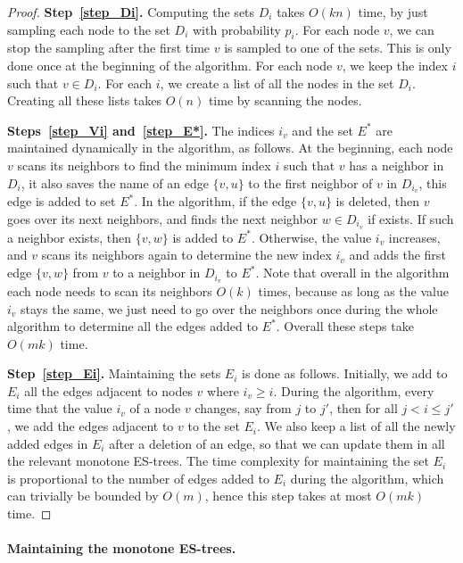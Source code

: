 \begin{proof}
\textbf{Step~\ref{step_Di}.} Computing the sets $D_i$ takes $O(kn)$ time, by just sampling each node to the set $D_i$ with probability $p_i$. For each node $v$, we can stop the sampling after the first time $v$ is sampled to one of the sets. This is only done once at the beginning of the algorithm. For each node $v$, we keep the index $i$ such that $v \in D_i$. For each $i$, we create a list of all the nodes in the set $D_i$. Creating all these lists takes $O(n)$ time by scanning the nodes.

\textbf{Steps~\ref{step_Vi} and~\ref{step_E*}.} The indices $i_v$ and the set $E^*$ are maintained dynamically in the algorithm, as follows. At the beginning, each node $v$ scans its neighbors to find the minimum index $i$ such that $v$ has a neighbor in $D_i$, it also saves the name of an edge $\{v,u\}$ to the first neighbor of $v$ in $D_{i_v}$, this edge is added to set $E^*$. In the algorithm, if the edge $\{v,u\}$ is deleted, then $v$ goes over its next neighbors, and finds the next neighbor $w \in D_{i_v}$ if exists. If such a neighbor exists, then $\{v,w\}$ is added to $E^*$. Otherwise, the value $i_v$ increases, and $v$ scans its neighbors again to determine the new index $i_v$ and adds the first edge $\{v,w\}$ from $v$ to a neighbor in $D_{i_v}$ to $E^*$. Note that overall in the algorithm each node needs to scan its neighbors $O(k)$ times, because as long as the value $i_v$ stays the same, we just need to go over the neighbors once during the whole algorithm to determine all the edges added to $E^*$. Overall these steps take $O(mk)$ time. 

\textbf{Step~\ref{step_Ei}.} Maintaining the sets $E_i$ is done as follows. Initially, we add to $E_i$ all the edges adjacent to nodes $v$ where $i_v \geq i$. During the algorithm, every time that the value $i_v$ of a node $v$ changes, say from $j$ to $j'$, then for all $j < i \leq j'$, we add the edges adjacent to $v$ to the set $E_i$. We also keep a list of all the newly added edges in $E_i$ after a deletion of an edge, so that we can update them in all the relevant monotone ES-trees. The time complexity for maintaining the set $E_i$ is proportional to the number of edges added to $E_i$ during the algorithm, which can trivially be bounded by $O(m)$, hence this step takes at most $O(mk)$ time.  
\end{proof}

\paragraph{Maintaining the monotone ES-trees.} 

